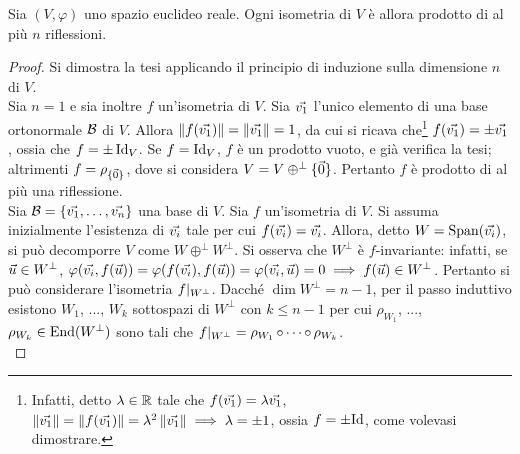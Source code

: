 \begin{theorem}  Sia $(V, \varphi)$ uno spazio euclideo reale.
	Ogni isometria di $V$ è allora prodotto di al più $n$ riflessioni.
\end{theorem}

\begin{proof}
	Si dimostra la tesi applicando il principio di induzione sulla dimensione $n$
	di $V$. \\
	
	\basestep Sia $n = 1$ e sia inoltre $f$ un'isometria di $V$. Sia $\vv 1$ l'unico elemento di una base ortonormale $\mathcal{B}$ di $V$. Allora $\norm{f(\vv 1)} = \norm{\vv 1} = 1$, da cui si ricava che\footnote{Infatti, detto $\lambda \in \mathbb R$ tale che $f(\vv 1) = \lambda \vv 1$, $\norm{\vv 1} = \norm{f(\vv 1)} = \lambda^2 \norm{\vv 1} \implies \lambda = \pm 1$, ossia $f = \pm \mathrm{Id}$, come volevasi dimostrare.} $f(\vv 1) = \pm \vv 1$,
	ossia che $f = \pm \operatorname{Id}_V$. Se $f = \operatorname{Id}_V$, $f$ è un prodotto vuoto, e già verifica la tesi; altrimenti
	$f = \rho_{\zerovecset}$, dove si considera $V = V \oplus^\perp \zerovecset$. Pertanto $f$ è prodotto
	di al più una riflessione. \\
	
	\inductivestep Sia $\basis = \{ \vv1, \ldots, \vv n \}$ una base di $V$. Sia $f$ un'isometria di $V$. Si
	assuma inizialmente l'esistenza di $\vv i$ tale per cui $f(\vv i) = \vv i$. Allora, detto $W = \Span(\vv i)$, si può decomporre $V$ come $W \oplus^\perp W^\perp$. Si osserva che $W^\perp$ è $f$-invariante: infatti,
	se $\U \in W^\perp$, $\varphi(\vv i, f(\U)) = \varphi(f(\vv i), f(\U)) = \varphi(\vv i, \U) = 0 \implies
	f(\U) \in W^\perp$. Pertanto si può considerare l'isometria $f\arrowvert_{W^\perp}$. Dacché $\dim W^\perp = n - 1$,
	per il passo induttivo esistono $W_1$, ..., $W_k$ sottospazi di $W^\perp$ con $k \leq n-1$ per cui $\rho_{W_1}$, ..., $\rho_{W_k} \in \operatorname{End}(W^\perp)$ sono tali che $\restr{f}{W^\perp} = \rho_{W_1} \circ \cdots \circ \rho_{W_k}$. \\
	

\end{proof}
